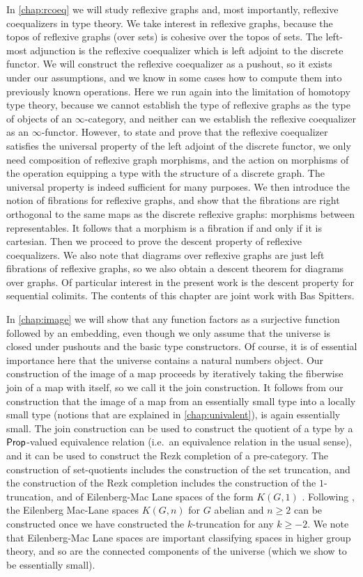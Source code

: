 In \cref{chap:rcoeq} we will study reflexive graphs and, most importantly, reflexive coequalizers in type theory. We take interest in reflexive graphs, because the topos of reflexive graphs (over sets) is cohesive over the topos of sets. The left-most adjunction is the reflexive coequalizer which is left adjoint to the discrete functor. We will construct the reflexive coequalizer as a pushout, so it exists under our assumptions, and we know in some cases how to compute them into previously known operations. Here we run again into the limitation of homotopy type theory, because we cannot establish the type of reflexive graphs as the type of objects of an $\infty$-category, and neither can we establish the reflexive coequalizer as an $\infty$-functor. However, to state and prove that the reflexive coequalizer satisfies the universal property of the left adjoint of the discrete functor, we only need composition of reflexive graph morphisms, and the action on morphisms of the operation equipping a type with the structure of a discrete graph. The universal property is indeed sufficient for many purposes. We then introduce the notion of fibrations for reflexive graphs, and show that the fibrations are right orthogonal to the same maps as the discrete reflexive graphs: morphisms between representables. It follows that a morphism is a fibration if and only if it is cartesian. Then we proceed to prove the descent property of reflexive coequalizers. We also note that diagrams over reflexive graphs are just left fibrations of reflexive graphs, so we also obtain a descent theorem for diagrams over graphs. Of particular interest in the present work is the descent property for sequential colimits. The contents of this chapter are joint work with Bas Spitters.

In \cref{chap:image} we will show that any function factors as a surjective function followed by an embedding, even though we only assume that the universe is closed under pushouts and the basic type constructors. Of course, it is of essential importance here that the universe contains a natural numbers object. Our construction of the image of a map proceeds by iteratively taking the fiberwise join of a map with itself, so we call it the join construction. It follows from our construction that the image of a map from an essentially small type into a locally small type (notions that are explained in \cref{chap:univalent}), is again essentially small. The join construction can be used to construct the quotient of a type by a $\mathsf{Prop}$-valued equivalence relation (i.e.~an equivalence relation in the usual sense), and it can be used to construct the Rezk completion of a pre-category. The construction of set-quotients includes the construction of the set truncation, and the construction of the Rezk completion includes the construction of the $1$-truncation, and of Eilenberg-Mac Lane spaces of the form $K(G,1)$ \cite{FinsterLicata}. Following \cite{FinsterLicata}, the Eilenberg Mac-Lane spaces $K(G,n)$ for $G$ abelian and $n\geq 2$ can be constructed once we have constructed the $k$-truncation for any $k\geq -2$. We note that Eilenberg-Mac Lane spaces are important classifying spaces in higher group theory, and so are the connected components of the universe (which we show to be essentially small). 

